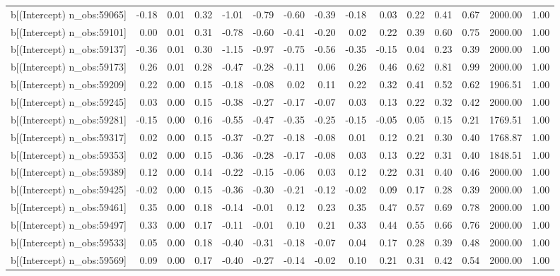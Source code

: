\begin{table}[ht]
\begin{tabular}{rrrrrrrrrrrrrrr}
  b[(Intercept) n\_obs:59065] & -0.18 & 0.01 & 0.32 & -1.01 & -0.79 & -0.60 & -0.39 & -0.18 & 0.03 & 0.22 & 0.41 & 0.67 & 2000.00 & 1.00 \\ 
  b[(Intercept) n\_obs:59101] & 0.00 & 0.01 & 0.31 & -0.78 & -0.60 & -0.41 & -0.20 & 0.02 & 0.22 & 0.39 & 0.60 & 0.75 & 2000.00 & 1.00 \\ 
  b[(Intercept) n\_obs:59137] & -0.36 & 0.01 & 0.30 & -1.15 & -0.97 & -0.75 & -0.56 & -0.35 & -0.15 & 0.04 & 0.23 & 0.39 & 2000.00 & 1.00 \\ 
  b[(Intercept) n\_obs:59173] & 0.26 & 0.01 & 0.28 & -0.47 & -0.28 & -0.11 & 0.06 & 0.26 & 0.46 & 0.62 & 0.81 & 0.99 & 2000.00 & 1.00 \\ 
  b[(Intercept) n\_obs:59209] & 0.22 & 0.00 & 0.15 & -0.18 & -0.08 & 0.02 & 0.11 & 0.22 & 0.32 & 0.41 & 0.52 & 0.62 & 1906.51 & 1.00 \\ 
  b[(Intercept) n\_obs:59245] & 0.03 & 0.00 & 0.15 & -0.38 & -0.27 & -0.17 & -0.07 & 0.03 & 0.13 & 0.22 & 0.32 & 0.42 & 2000.00 & 1.00 \\ 
  b[(Intercept) n\_obs:59281] & -0.15 & 0.00 & 0.16 & -0.55 & -0.47 & -0.35 & -0.25 & -0.15 & -0.05 & 0.05 & 0.15 & 0.21 & 1769.51 & 1.00 \\ 
  b[(Intercept) n\_obs:59317] & 0.02 & 0.00 & 0.15 & -0.37 & -0.27 & -0.18 & -0.08 & 0.01 & 0.12 & 0.21 & 0.30 & 0.40 & 1768.87 & 1.00 \\ 
  b[(Intercept) n\_obs:59353] & 0.02 & 0.00 & 0.15 & -0.36 & -0.28 & -0.17 & -0.08 & 0.03 & 0.13 & 0.22 & 0.31 & 0.40 & 1848.51 & 1.00 \\ 
  b[(Intercept) n\_obs:59389] & 0.12 & 0.00 & 0.14 & -0.22 & -0.15 & -0.06 & 0.03 & 0.12 & 0.22 & 0.31 & 0.40 & 0.46 & 2000.00 & 1.00 \\ 
  b[(Intercept) n\_obs:59425] & -0.02 & 0.00 & 0.15 & -0.36 & -0.30 & -0.21 & -0.12 & -0.02 & 0.09 & 0.17 & 0.28 & 0.39 & 2000.00 & 1.00 \\ 
  b[(Intercept) n\_obs:59461] & 0.35 & 0.00 & 0.18 & -0.14 & -0.01 & 0.12 & 0.23 & 0.35 & 0.47 & 0.57 & 0.69 & 0.78 & 2000.00 & 1.00 \\ 
  b[(Intercept) n\_obs:59497] & 0.33 & 0.00 & 0.17 & -0.11 & -0.01 & 0.10 & 0.21 & 0.33 & 0.44 & 0.55 & 0.66 & 0.76 & 2000.00 & 1.00 \\ 
  b[(Intercept) n\_obs:59533] & 0.05 & 0.00 & 0.18 & -0.40 & -0.31 & -0.18 & -0.07 & 0.04 & 0.17 & 0.28 & 0.39 & 0.48 & 2000.00 & 1.00 \\ 
  b[(Intercept) n\_obs:59569] & 0.09 & 0.00 & 0.17 & -0.40 & -0.27 & -0.14 & -0.02 & 0.10 & 0.21 & 0.31 & 0.42 & 0.54 & 2000.00 & 1.00 \\ 

\end{tabular}
\end{table}
